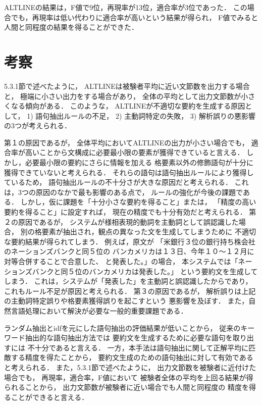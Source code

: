 ALTLINEの結果は，F値で9位，再現率が13位，適合率が3位であった．
この場合でも，再現率は低い代わりに適合率が高いという結果が得られ，
F値でみると人間と同程度の結果を得ることができた．



\section{考察}

5.3.1節で述べたように，
ALTLINEは被験者平均に近い文節数を出力する場合と，
極端に小さい出力をする場合があり，
全体の平均として出力文節数が小さくなる傾向がある．
このような，
ALTLINEが不適切な要約を生成する原因として，
1) 語句抽出ルールの不足，
2) 主動詞特定の失敗，
3) 解析誤りの悪影響
の3つが考えられる．

第１の原因であるが，
全体平均においてALTLINEの出力が小さい場合でも，
適合率が高いことから文構成に必要最小限の要素が獲得できていると言える．
しかし，必要最小限の要約にさらに情報を加える
格要素以外の修飾語句が十分に獲得できていないと考えられる．
それらの語句は語句抽出ルールにより獲得しているため，
語句抽出ルールの不十分さが大きな原因だと考えられる．
これは，3つの原因のなかで最も影響のある点で，
ルールの強化が今後の課題である．
しかし，仮に課題を「十分小さな要約を得ること」または，
「精度の高い要約を得ること」に設定すれば，
現在の精度でも十分有効だと考えられる．
第２の原因であるが，
システムが様相表現的動詞を主動詞として誤認識した場合，
別の格要素が抽出され，観点の異なった文を生成してしまうために
不適切な要約結果が得られてしまう．
例えば，原文が
「米銀行３位の銀行持ち株会社のネーションズバンクと同５位の
バンカメリカは１３日、今年１０〜１２月に対等合併することで合意した、
と発表した。」の場合，
本システムでは「ネーションズバンクと同５位のバンカメリカは発表した。」
という要約文を生成してしまう．
これは，システムが「発表した」を主動詞と誤認識したからであり，
これもルール不足が原因と考えられる．
第３の原因であるが，
解析誤りは上記の主動詞特定誤りや格要素獲得誤りを起こすという
悪影響を及ぼす．
また，自然言語処理において解決が必要な一般的重要課題である．

ランダム抽出とidfを元にした語句抽出の評価結果が低いことから，
従来のキーワード抽出的な語句抽出方法では
要約文を生成するために必要な語句を取り出すには
不十分であると言える．
一方，本手法は語句抽出に関して正解平均に匹敵する精度を得たことから，
要約文生成のための語句抽出に対して有効であると考えられる．
また，5.3.1節で述べたように，
出力文節数を被験者に近付けた場合でも，
再現率，適合率，F値において
被験者全体の平均を上回る結果が得られることから，
出力文節数が被験者に近い場合でも人間と同程度の
精度を得ることができると言える．


